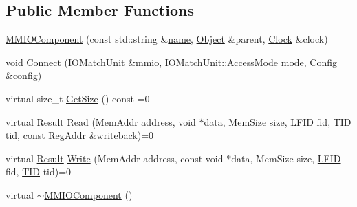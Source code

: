 \subsection*{Public Member Functions}
\begin{DoxyCompactItemize}
\item 
\hyperlink{class_simulator_1_1drisc_1_1_m_m_i_o_component_af3214000a093ff9ffe7c2e7805837c92}{M\+M\+I\+O\+Component} (const std\+::string \&\hyperlink{mtconf_8c_a8f8f80d37794cde9472343e4487ba3eb}{name}, \hyperlink{class_simulator_1_1_object}{Object} \&parent, \hyperlink{class_simulator_1_1_clock}{Clock} \&clock)
\item 
void \hyperlink{class_simulator_1_1drisc_1_1_m_m_i_o_component_a9b2cc301afd5385a5cd1b9efe298e13e}{Connect} (\hyperlink{class_simulator_1_1drisc_1_1_i_o_match_unit}{I\+O\+Match\+Unit} \&mmio, \hyperlink{class_simulator_1_1drisc_1_1_i_o_match_unit_ab8216ac84dabbc1133fe4d26298de231}{I\+O\+Match\+Unit\+::\+Access\+Mode} mode, \hyperlink{class_config}{Config} \&config)
\item 
virtual size\+\_\+t \hyperlink{class_simulator_1_1drisc_1_1_m_m_i_o_component_ad8f1a93b445f287895949bfe52972346}{Get\+Size} () const =0
\item 
virtual \hyperlink{namespace_simulator_a4b6b5616e7236c0c131516a441776805}{Result} \hyperlink{class_simulator_1_1drisc_1_1_m_m_i_o_component_af07e2f3e1280d8d56cab7a59815e7eeb}{Read} (Mem\+Addr address, void $\ast$data, Mem\+Size size, \hyperlink{namespace_simulator_aaccbc706b2d6c99085f52f6dfc2333e4}{L\+F\+I\+D} fid, \hyperlink{namespace_simulator_a483cc4ecee1736e895054617672cded5}{T\+I\+D} tid, const \hyperlink{struct_simulator_1_1_reg_addr}{Reg\+Addr} \&writeback)=0
\item 
virtual \hyperlink{namespace_simulator_a4b6b5616e7236c0c131516a441776805}{Result} \hyperlink{class_simulator_1_1drisc_1_1_m_m_i_o_component_aab3662058e7a00109b122a1460188a8b}{Write} (Mem\+Addr address, const void $\ast$data, Mem\+Size size, \hyperlink{namespace_simulator_aaccbc706b2d6c99085f52f6dfc2333e4}{L\+F\+I\+D} fid, \hyperlink{namespace_simulator_a483cc4ecee1736e895054617672cded5}{T\+I\+D} tid)=0
\item 
virtual \hyperlink{class_simulator_1_1drisc_1_1_m_m_i_o_component_afdf7c6e275fd7816983f115bad31d14b}{$\sim$\+M\+M\+I\+O\+Component} ()
\end{DoxyCompactItemize}


